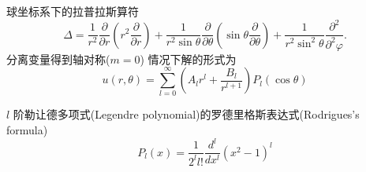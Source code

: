 \documentclass{njustexam}
\begin{document}


球坐标系下的拉普拉斯算符
\[
 \Delta = \frac{1}{r^2} \frac{\partial}{\partial r} \left( r^2 \frac{\partial }{\partial r} \right)
  + \frac{1}{r^2\sin \theta} \frac{\partial}{\partial \theta} \left( \sin\theta \frac{\partial}{\partial \theta} \right)
  + \frac{1}{r^2\sin^2 \theta} \frac{\partial^2}{\partial^2 \varphi} .
\]
分离变量得到轴对称($m=0$)
情况下解的形式为
\[
  u(r,  \theta) = \sum_{l=0}^{\infty} \left( A_l r^l + \frac{B_l}{r^{l+1}} \right) P_{l} (\cos \theta)
\]

\smallskip

$l$ 阶勒让德多项式(Legendre polynomial)的罗德里格斯表达式(Rodrigues's formula) 
$$P_l(x)=\frac{1}{2^l l !} \frac{d^l}{d x^l}\left(x^2-1\right)^l$$
\end{document}
